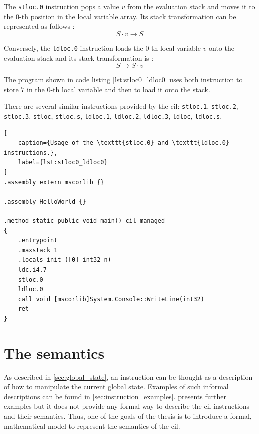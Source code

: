 \documentclass{article}
\numberwithin{equation}{section}
\begin{document}
The \texttt{stloc.0} instruction pops a value $v$ from the evaluation stack and moves it to the $0$-th position in the local variable array. Its stack transformation can be represented as follows \cite{ecmaStandard}:
$$
	S \cdot v \rightarrow S
$$

Conversely, the \texttt{ldloc.0} instruction loads the $0$-th local variable $v$ onto the evaluation stack and its stack transformation is \cite{ecmaStandard}:
$$
	S \rightarrow S \cdot v
$$

The program shown in code listing \ref{lst:stloc0_ldloc0} uses both instruction to store $7$ in the $0$-th local variable and then to load it onto the stack.

There are several similar instructions provided by the \acrshort{cil}: \texttt{stloc.1}, \texttt{stloc.2}, \texttt{stloc.3}, \texttt{stloc}, \texttt{stloc.s}, \texttt{ldloc.1}, \texttt{ldloc.2}, \texttt{ldloc.3}, \texttt{ldloc}, \texttt{ldloc.s}.

\begin{lstlisting}[
	caption={Usage of the \texttt{stloc.0} and \texttt{ldloc.0} instructions.},
	label={lst:stloc0_ldloc0}
]
.assembly extern mscorlib {}

.assembly HelloWorld {}

.method static public void main() cil managed
{
	.entrypoint
	.maxstack 1
	.locals init ([0] int32 n)
	ldc.i4.7
	stloc.0
	ldloc.0
	call void [mscorlib]System.Console::WriteLine(int32)
	ret
}
\end{lstlisting}

\clearpage


\section{The semantics}
\label{sec:semantics}

As described in \ref{sec:global_state}, an instruction can be thought as a description of how to manipulate the current global state. Examples of such informal descriptions can be found in \ref{sec:instruction_examples}. \cite{ecmaStandard} presents further examples but it does not provide any formal way to describe the \acrshort{cil} instructions and their semantics. Thus, one of the goals of the thesis is to introduce a formal, mathematical model to represent the semantics of the \acrshort{cil}.
\end{document}
